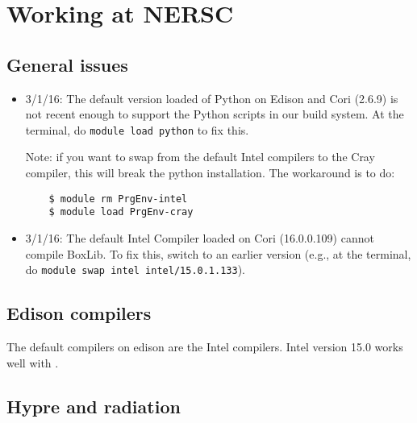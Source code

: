 \section{Working at NERSC}

\subsection{General issues}

\begin{itemize}

\item 3/1/16: The default version loaded of Python on Edison and Cori
  (2.6.9) is not recent enough to support the Python scripts in our
  build system. At the terminal, do {\tt module load python} to fix
  this.

  Note: if you want to swap from the default Intel compilers to the 
  Cray compiler, this will break the python installation.  The workaround
  is to do:
  \begin{verbatim}
    $ module rm PrgEnv-intel
    $ module load PrgEnv-cray
  \end{verbatim}

\item 3/1/16: The default Intel Compiler loaded on Cori (16.0.0.109)
  cannot compile BoxLib. To fix this, switch to an earlier version
  (e.g., at the terminal, do {\tt module swap intel
    intel/15.0.1.133}).


\end{itemize}

\subsection{Edison compilers}

The default compilers on edison are the Intel compilers.  Intel version 15.0
works well with \castro.


\subsection{Hypre and radiation}

